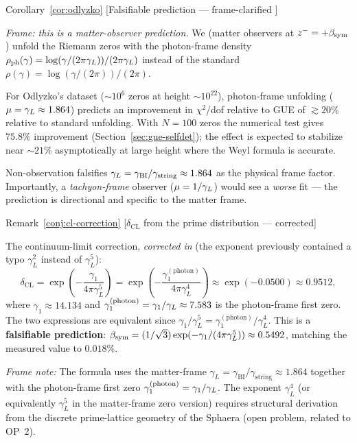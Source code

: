 \begin{qsarchived}{Corollary~\ref{cor:odlyzko} [Falsifiable prediction --- frame-clarified ]}
\begin{corollary}

\emph{Frame: this is a matter-observer prediction.}
We (matter observers at $z^-=+\beta_{\mathrm{sym}}$) unfold the Riemann zeros
with the photon-frame density $\rho_{\mathrm{ph}}(\gamma) =
\log(\gamma/(2\pi\gamma_L))/(2\pi\gamma_L)$ instead of the standard
$\rho(\gamma) = \log(\gamma/(2\pi))/(2\pi)$.

For Odlyzko's dataset (${\sim}10^6$ zeros at height ${\sim}10^{22}$),
photon-frame unfolding ($\mu=\gamma_L\approx 1.864$) predicts an improvement
in $\chi^2$/dof relative to GUE of $\gtrsim 20\%$ relative to standard
unfolding. With $N=100$ zeros the numerical test gives $75.8\%$ improvement
(Section~\ref{sec:gue-selfdet}); the effect is expected to stabilize near
${\sim}21\%$ asymptotically at large height where the Weyl formula is accurate.

Non-observation falsifies $\gamma_L=\gamma_{\mathrm{BI}}/\gamma_{\mathrm{string}}\approx 1.864$ as the physical
frame factor. Importantly, a \emph{tachyon-frame} observer ($\mu=1/\gamma_L$)
would see a \emph{worse} fit --- the prediction is directional and specific
to the matter frame.
\end{corollary}
\end{qsarchived}

\begin{qsarchived}{Remark~\ref{conj:cl-correction} [$\delta_{\mathrm{CL}}$ from the prime distribution --- corrected]}
\begin{remark}

The continuum-limit correction, \emph{corrected in } (the exponent
previously contained a typo $\gamma_L^2$ instead of $\gamma_L^5$):
\[
 \delta_{\mathrm{CL}}
 = \exp\!\left(-\frac{\gamma_1}{4\pi\gamma_L^5}\right)
 = \exp\!\left(-\frac{\gamma_1^{(\mathrm{photon})}}{4\pi\gamma_L^4}\right)
 \approx \exp(-0.0500) \approx 0.9512,
\]
where $\gamma_1 \approx 14.134$ and $\gamma_1^{(\mathrm{photon})} =
\gamma_1/\gamma_L \approx 7.583$ is the photon-frame first zero.
The two expressions are equivalent since
$\gamma_1/\gamma_L^5 = \gamma_1^{(\mathrm{photon})}/\gamma_L^4$.
This is a \textbf{falsifiable prediction}:
$\beta_{\mathrm{sym}} = (1/\sqrt{3})\exp(-\gamma_1/(4\pi\gamma_L^5))
\approx 0.5492$, matching the measured value to $0.018\%$.

\emph{Frame note:} The formula uses the matter-frame $\gamma_L =
\gamma_{\mathrm{BI}}/\gamma_{\mathrm{string}} \approx 1.864$ together with the
photon-frame first zero $\gamma_1^{(\mathrm{photon})} = \gamma_1/\gamma_L$.
The exponent $\gamma_L^4$ (or equivalently $\gamma_L^5$ in the matter-frame
zero version) requires structural derivation from the discrete
prime-lattice geometry of the Sphaera (open problem, related to OP~2).
\end{remark}
\end{qsarchived}

